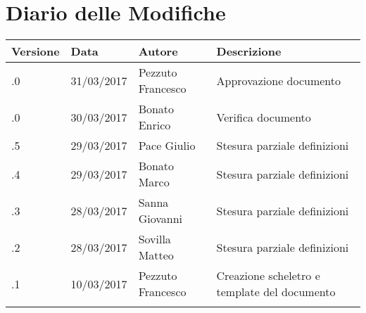 \section*{Diario delle Modifiche}
\begin{longtabu} to \textwidth {
	X[4,l,p]
	X[4,l,p]
	X[4,l,p]
	X[8,l,p]}
	\toprule
		 Versione & Data & Autore & Descrizione \\
		\midrule
		\endhead
		\addlinespace[0.2em]
		\midrule
		.0 & 31/03/2017 & Pezzuto Francesco & Approvazione documento\\
		\addlinespace[0.2em]
		\midrule
		.0 & 30/03/2017 & Bonato Enrico & Verifica documento\\
		\addlinespace[0.2em]
		\midrule
		.5 & 29/03/2017 & Pace Giulio & Stesura parziale definizioni\\
		\addlinespace[0.2em]
		\midrule
		.4 & 29/03/2017 & Bonato Marco & Stesura parziale definizioni\\
		\addlinespace[0.2em]
		\midrule
		.3 & 28/03/2017 & Sanna Giovanni & Stesura parziale definizioni\\
		\addlinespace[0.2em]
		\midrule
		.2 & 28/03/2017 & Sovilla Matteo & Stesura parziale definizioni\\
		\addlinespace[0.2em]
		\midrule
		.1 & 10/03/2017 & Pezzuto Francesco & Creazione scheletro e template del documento\\
		\addlinespace[0.4em]
		
	\bottomrule
\end{longtabu}